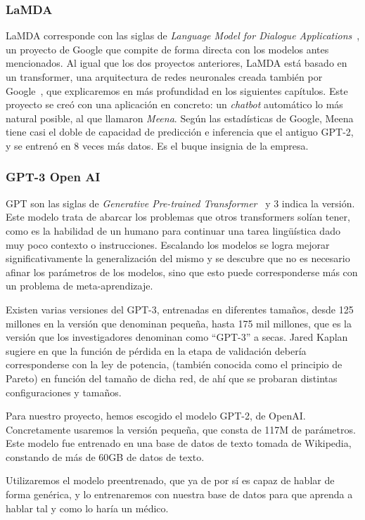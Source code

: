 \subsubsection{LaMDA}
LaMDA corresponde con las siglas de \textit{Language Model for Dialogue Applications}~\cite{LaMDAGoogle2020}, un proyecto de Google que compite de forma directa con los modelos antes mencionados. Al igual que los dos proyectos anteriores, LaMDA está basado en un transformer, una arquitectura de redes neuronales creada también por Google~\cite{TransformerAshish2017}, que explicaremos en más profundidad en los siguientes capítulos. Este proyecto se creó con una aplicación en concreto: un \textit{chatbot} automático lo más natural posible, al que llamaron \textit{Meena}. Según las estadísticas de Google, Meena tiene casi el doble de capacidad de predicción e inferencia que el antiguo GPT-2, y se entrenó en 8 veces más datos. Es el buque insignia de la empresa.

\subsubsection{GPT-3 Open AI}
GPT son las siglas de \textit{Generative Pre-trained Transformer}~\cite{GPT3openAI2020} y 3 indica la versión. Este modelo trata de abarcar los problemas que otros transformers solían tener, como es la habilidad de un humano para continuar una tarea lingüística dado muy poco contexto o instrucciones. Escalando los modelos se logra mejorar significativamente la generalización del mismo y se descubre que no es necesario afinar los parámetros de los modelos, sino que esto puede corresponderse más con un problema de meta-aprendizaje.

Existen varias versiones del GPT-3, entrenadas en diferentes tamaños, desde 125 millones en la versión que denominan pequeña, hasta 175 mil millones, que es la versión que los investigadores denominan como ``GPT-3'' a secas. Jared Kaplan sugiere en \cite{kaplan2020scaling} que la función de pérdida en la etapa de validación debería corresponderse con la ley de potencia, (también conocida como el principio de Pareto) en función del tamaño de dicha red, de ahí que se probaran distintas configuraciones y tamaños.

Para nuestro proyecto, hemos escogido el modelo GPT-2, de OpenAI. Concretamente usaremos la versión pequeña, que consta de 117M de parámetros. Este modelo fue entrenado en una base de datos de texto tomada de Wikipedia, constando de más de 60GB de datos de texto. 

Utilizaremos el modelo preentrenado, que ya de por sí es capaz de hablar de forma genérica, y lo entrenaremos con nuestra base de datos para que aprenda a hablar tal y como lo haría un médico.



